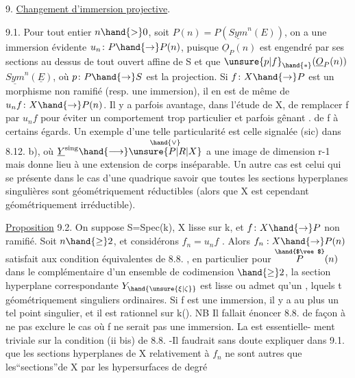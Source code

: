 
9. \uline{Changement d'immersion projective}.

9.1. Pour tout entier $n \hand{>} 0$, soit $P(n) = P(\underline{Sym}^n(E))$, on a une
immersion évidente $u_n\colon P \hand{\to} P(n)$, puisque $\underline{O}_P(n)$ est engendré par
ses sections au dessus de tout ouvert affine de S et que $\unsure{p|f}_{\hand{*}}(\underline{O}_P(n))$
$\underline{Sym}^n(\underline{E})$, où $p\colon P \hand{\to} S$ est la projection. Si $f\colon X\hand{\to} P$ est un morphisme
non ramifié (resp. une immersion), il en est de même de $u_n f\colon X \hand{\to} P(n)$.
Il y a parfois avantage, dans l'étude de X, de  remplacer f par $u_n f$ 
pour éviter un comportement trop particulier et parfois  gênant .
de f à certains égards. Un exemple d'une telle particularité est celle
 signalée (sic) dans 8.12. b),  où $\underline{Y}^{\mathrm{sing}} \hand{\longrightarrow} \overset{\hand{\vee}}{\unsure{P|R|X}}$ a une image de
dimension r-1 mais  donne lieu à une extension
de corps inséparable. Un autre cas est celui qui se présente dans le cas
d'une quadrique  savoir que
toutes les sections hyperplanes singulières sont géométriquement
réductibles (alors que X est cependant géométriquement irréductible).

\uline{Proposition} 9.2. On suppose S=Spec(k), X lisse sur k, et $f\colon X\hand{\to} P$ non
ramifié. Soit $n \hand{\geq} 2$, et considérons $f_n = u_n f$ . Alors $f_n : X \hand{\to} P(n)$
satisfait aux condition équivalentes de 8.8. , en particulier
pour \hand{$\unsure{\xi|\zeta} \in$} $\overset{\hand{$\vee$}}{P}(n)$ dans le complémentaire d'un ensemble de codimension $\hand{\geq} 2$,
la section hyperplane correspondante $Y_{\hand{\unsure{\xi|\zeta}}}$ est lisse  ou admet qu'un
, lquels t géométriquement singuliers
ordinaires. Si f est une immersion, il y a au
plus un tel point singulier, et il est rationnel sur k(\hand{$\unsure{\xi|\zeta}$}).
\margin{$\|$} NB Il fallait énoncer 8.8. de façon à  ne pas exclure le
cas où f ne serait pas une immersion. La  est essentielle-%
ment triviale sur la condition (ii bis) de 8.8. -Il faudrait sans doute
expliquer dans 9.1. que les sections hyperplanes de X relativement à
 $f_n$ ne sont autres que les``sections''de X par les hypersurfaces de degré

